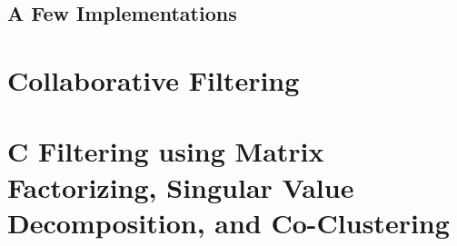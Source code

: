 \documentclass{article}
\begin{document}
\subsection{A Few Implementations}

\subsubsection{}

\section{Collaborative Filtering}
\section{C Filtering using Matrix Factorizing, Singular Value Decomposition, and Co-Clustering}
\end{document}
